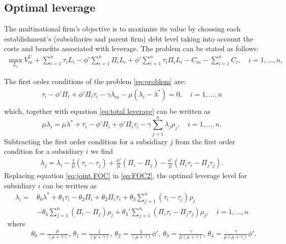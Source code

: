 \documentclass[12pt]{article}
\begin{document}
	\subsection{Optimal leverage}
	\label{subsec:opt_leverage}
	The multinational firm's objective is to maximize its value by choosing each establishment's (subsidiaries and parent firm) debt level taking into account the costs and benefits associated with leverage. The problem can be stated as follows: 
	\begin{equation}
	\begin{aligned}
	\max_{L_i}V_m^U+\sum_{i=1}^{n}\tau_iL_i-\phi'\sum_{i=1}^{n}\Pi_iL_i+\phi'\sum_{i=1}^{n}\tau_i\Pi_i L_i-C_m-\sum_{i=1}^{n}C_i, \quad i=1,...,n,
	\end{aligned}
	\label{eq:problem}
	\end{equation}
	
	The first order conditions of the problem \ref{eq:problem} are:
	\begin{equation}
	\begin{aligned}
	\tau_i-\phi'\Pi_i+\phi'\Pi_i\tau_{i}-\gamma\lambda_m-\mu(\lambda_i-\lambda^*)=0, \quad i=1,...,n\\
	\end{aligned}
	\label{eq:FOC}
	\end{equation}
	which, together with equation \ref{eq:total leverage} can be written as  
	\begin{equation}
	\mu\lambda_i=\mu\lambda^*+\tau_{i}-\phi'\Pi_i+\phi'\Pi_i\tau_{i}-\gamma \sum_{j=1}^{n}\lambda_j\rho_j, \quad i=1,...,n.
	\label{eq:FOC2}
	\end{equation}
	Subtracting the first order condition for a subsidiary $j$ from the first order condition for a subsidiary $i$ we find
	\begin{equation}
	\begin{aligned}
	\lambda_j=\lambda_i-\frac{1}{\mu}(\tau_i-\tau_j)+\frac{\phi'}{\mu}(\Pi_i-\Pi_j)-\frac{\phi'}{\mu}(\Pi_i\tau_i-\Pi_j\tau_j).
	\end{aligned}
	\label{eq:joint FOC}
	\end{equation}
	Replacing equation \ref{eq:joint FOC} in \ref{eq:FOC2}, the optimal leverage level for subsidiary $i$ can be written as  
	\begin{equation}
	\begin{aligned}
	\lambda_i=&\theta_0\lambda^*+\theta_1\tau_i-\theta_2\Pi_i+\theta_2\Pi_i\tau_{i}+\theta_3\sum_{j=1}^{n}(\tau_i-\tau_j)\rho_j\\
	&-\theta_4\sum_{j=1}^{n}(\Pi_i-\Pi_j)\rho_j+\theta_4'\sum_{j=1}^{n}(\Pi_i\tau_i-\Pi_j\tau_j)\rho_j, \quad i=1,...,n
	\end{aligned}
	\label{eq:optimal leverage in theory}
	\end{equation}
	\begin{equation*}
	\begin{aligned}
	\text{where} &\\ &\theta_0=\frac{\mu}{(\mu+\gamma)}, \ \theta_1=\frac{1}{(\mu+\gamma)}, \
	\theta_2=\frac{1}{(\mu+\gamma)}\phi', \
	\theta_3=\frac{\gamma}{\mu(\mu+\gamma)}, \
	\theta_4=\frac{\gamma}{\mu(\mu+\gamma)}\phi'.
	\end{aligned}
	\end{equation*}
\end{document}
